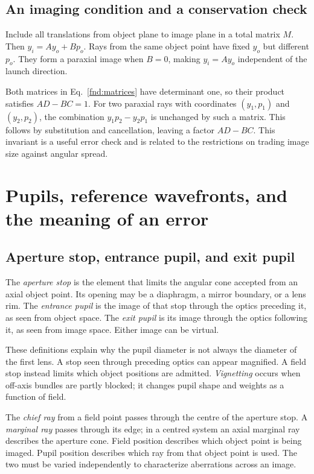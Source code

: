 \section{An imaging condition and a conservation check}
Include all translations from object plane to image plane in a total matrix $M$. Then $y_i=Ay_o+Bp_o$. Rays from the same object point have fixed $y_o$ but different $p_o$. They form a paraxial image when $B=0$, making $y_i=Ay_o$ independent of the launch direction.

Both matrices in Eq.~\eqref{fnd:matrices} have determinant one, so their product satisfies $AD-BC=1$. For two paraxial rays with coordinates $(y_1,p_1)$ and $(y_2,p_2)$, the combination $y_1p_2-y_2p_1$ is unchanged by such a matrix. This follows by substitution and cancellation, leaving a factor $AD-BC$. This invariant is a useful error check and is related to the restrictions on trading image size against angular spread.

\chapter{Pupils, reference wavefronts, and the meaning of an error}
\label{fnd:wavefronts}
\section{Aperture stop, entrance pupil, and exit pupil}
The \emph{aperture stop} is the element that limits the angular cone accepted from an axial object point. Its opening may be a diaphragm, a mirror boundary, or a lens rim. The \emph{entrance pupil} is the image of that stop through the optics preceding it, as seen from object space. The \emph{exit pupil} is its image through the optics following it, as seen from image space. Either image can be virtual.

These definitions explain why the pupil diameter is not always the diameter of the first lens. A stop seen through preceding optics can appear magnified. A field stop instead limits which object positions are admitted. \emph{Vignetting} occurs when off-axis bundles are partly blocked; it changes pupil shape and weights as a function of field.

The \emph{chief ray} from a field point passes through the centre of the aperture stop. A \emph{marginal ray} passes through its edge; in a centred system an axial marginal ray describes the aperture cone. Field position describes which object point is being imaged. Pupil position describes which ray from that object point is used. The two must be varied independently to characterize aberrations across an image.

